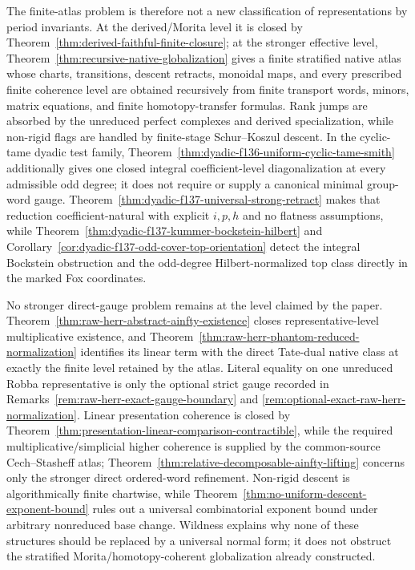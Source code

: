 \documentclass[11pt]{article}
\theoremstyle{definition}
\begin{document}
The finite-atlas problem is therefore not a new classification of representations by period invariants.  At the derived/Morita level it is closed by Theorem~\ref{thm:derived-faithful-finite-closure}; at the stronger effective level, Theorem~\ref{thm:recursive-native-globalization} gives a finite stratified native atlas whose charts, transitions, descent retracts, monoidal maps, and every prescribed finite coherence level are obtained recursively from finite transport words, minors, matrix equations, and finite homotopy-transfer formulas.  Rank jumps are absorbed by the unreduced perfect complexes and derived specialization, while non-rigid flags are handled by finite-stage Schur--Koszul descent.  In the cyclic-tame dyadic test family, Theorem~\ref{thm:dyadic-f136-uniform-cyclic-tame-smith} additionally gives one closed integral coefficient-level diagonalization at every admissible odd degree; it does not require or supply a canonical minimal group-word gauge.  Theorem~\ref{thm:dyadic-f137-universal-strong-retract} makes that reduction coefficient-natural with explicit $i,p,h$ and no flatness assumptions, while Theorem~\ref{thm:dyadic-f137-kummer-bockstein-hilbert} and Corollary~\ref{cor:dyadic-f137-odd-cover-top-orientation} detect the integral Bockstein obstruction and the odd-degree Hilbert-normalized top class directly in the marked Fox coordinates.

No stronger direct-gauge problem remains at the level claimed by the paper.  Theorem~\ref{thm:raw-herr-abstract-ainfty-existence} closes representative-level multiplicative existence, and Theorem~\ref{thm:raw-herr-phantom-reduced-normalization} identifies its linear term with the direct Tate-dual native class at exactly the finite level retained by the atlas.  Literal equality on one unreduced Robba representative is only the optional strict gauge recorded in Remarks~\ref{rem:raw-herr-exact-gauge-boundary} and \ref{rem:optional-exact-raw-herr-normalization}.  Linear presentation coherence is closed by Theorem~\ref{thm:presentation-linear-comparison-contractible}, while the required multiplicative/simplicial higher coherence is supplied by the common-source Cech--Stasheff atlas; Theorem~\ref{thm:relative-decomposable-ainfty-lifting} concerns only the stronger direct ordered-word refinement.  Non-rigid descent is algorithmically finite chartwise, while Theorem~\ref{thm:no-uniform-descent-exponent-bound} rules out a universal combinatorial exponent bound under arbitrary nonreduced base change.  Wildness explains why none of these structures should be replaced by a universal normal form; it does not obstruct the stratified Morita/homotopy-coherent globalization already constructed.
\end{document}
